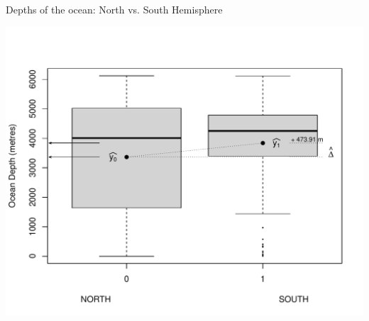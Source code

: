 \documentclass[10pt,handout]{beamer}\usepackage[]{graphicx}\usepackage[]{color}
\makeatletter
\def\maxwidth{ %
  \ifdim\Gin@nat@width>\linewidth
    \linewidth
  \else
    \Gin@nat@width
  \fi
}
\newenvironment{knitrout}{}{} %
\makeatother
\begin{document}
\begin{frame}[fragile]{Depths of the ocean: North vs. South Hemisphere}
	
\begin{knitrout}\tiny
{}\color{fgcolor}

{\centering \includegraphics[width=\maxwidth]{figure/unnamed-chunk-5-1} 

}


\end{knitrout}
	
	
\end{frame}
\end{document}
